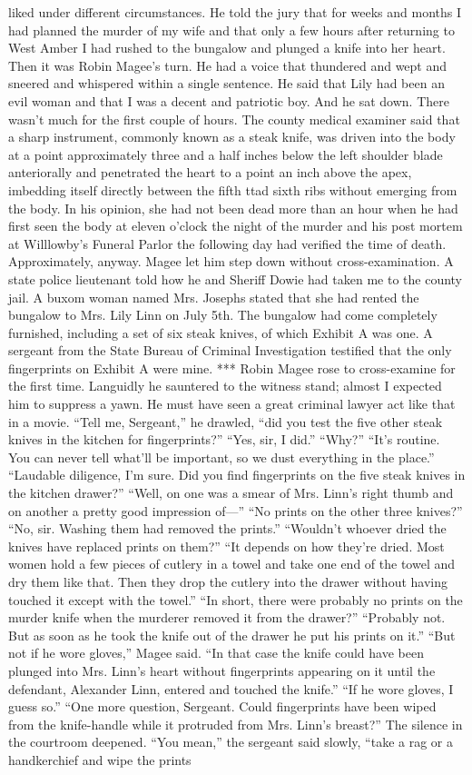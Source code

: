 \documentclass{novel}
\begin{document}
liked under different circumstances. He told the jury that for weeks and months I had planned the murder of my wife and that only a few hours after returning to West Amber I had rushed to the bungalow and plunged a knife into her heart. Then it was Robin Magee’s turn. He had a voice that thundered and wept and sneered and whispered within a single sentence. He said that Lily had been an evil woman and that I was a decent and patriotic boy. And he sat down. There wasn’t much for the first couple of hours. The county medical examiner said that a sharp instrument, commonly known as a steak knife, was driven into the body at a point approximately three and a half inches below the left shoulder blade anteriorally and penetrated the heart to a point an inch above the apex, imbedding itself directly between the fifth ttad sixth ribs without emerging from the body. In his opinion, she had not been dead more than an hour when he had first seen the body at eleven o’clock the night of the murder and his post mortem at Willlowby’s Funeral Parlor the following day had verified the time of death. Approximately, anyway. Magee let him step down without cross-examination. A state police lieutenant told how he and Sheriff Dowie had taken me to the county jail. A buxom woman named Mrs. Josephs stated that she had rented the bungalow to Mrs. Lily Linn on July 5th. The bungalow had come completely furnished, including a set of six steak knives, of which Exhibit A was one. A sergeant from the State Bureau of Criminal Investigation testified that the only fingerprints on Exhibit A were mine. *** Robin Magee rose to cross-examine for the first time. Languidly he sauntered to the witness stand; almost I expected him to suppress a yawn. He must have seen a great criminal lawyer act like that in a movie. “Tell me, Sergeant,” he drawled, “did you test the five other steak knives in the kitchen for fingerprints?” “Yes, sir, I did.” “Why?” “It’s routine. You can never tell what’ll be important, so we dust everything in the place.” “Laudable diligence, I’m sure. Did you find fingerprints on the five steak knives in the kitchen drawer?” “Well, on one was a smear of Mrs. Linn’s right thumb and on another a pretty good impression of—” “No prints on the other three knives?” “No, sir. Washing them had removed the prints.” “Wouldn’t whoever dried the knives have replaced prints on them?” “It depends on how they’re dried. Most women hold a few pieces of cutlery in a towel and take one end of the towel and dry them like that. Then they drop the cutlery into the drawer without having touched it except with the towel.” “In short, there were probably no prints on the murder knife when the murderer removed it from the drawer?” “Probably not. But as soon as he took the knife out of the drawer he put his prints on it.” “But not if he wore gloves,” Magee said. “In that case the knife could have been plunged into Mrs. Linn’s heart without fingerprints appearing on it until the defendant, Alexander Linn, entered and touched the knife.” “If he wore gloves, I guess so.” “One more question, Sergeant. Could fingerprints have been wiped from the knife-handle while it protruded from Mrs. Linn’s breast?” The silence in the courtroom deepened. “You mean,” the sergeant said slowly, “take a rag or a handkerchief and wipe the prints 
\end{document}
